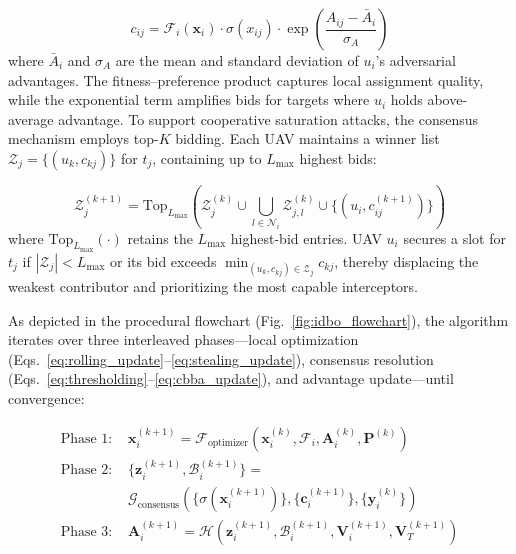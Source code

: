 \documentclass[lettersize,journal]{IEEEtran}
\begin{document}
\begin{equation}
\label{eq:bid_formulation}
c_{ij} = \mathcal{F}_i(\mathbf{x}_i) \cdot \sigma(x_{ij}) \cdot \exp\left(\frac{A_{ij} - \bar{A}_i}{\sigma_A}\right)
\end{equation}
where $\bar{A}_i$ and $\sigma_A$ are the mean and standard deviation of $u_i$'s adversarial advantages. The fitness--preference product captures local assignment quality, while the exponential term amplifies bids for targets where $u_i$ holds above-average advantage. To support cooperative saturation attacks, the consensus mechanism employs top-$K$ bidding. Each UAV maintains a winner list $\mathcal{Z}_{j} = \{(u_k, c_{kj})\}$ for $t_j$, containing up to $L_{\max}$ highest bids:

\begin{equation}
\label{eq:cbba_update}
\mathcal{Z}_{j}^{(k+1)} = \text{Top}_{L_{\max}} \left( \mathcal{Z}_{j}^{(k)} \cup \bigcup_{l \in \mathcal{N}_i} \mathcal{Z}_{j,l}^{(k)} \cup \{(u_i, c_{ij}^{(k+1)})\} \right)
\end{equation}
where $\text{Top}_{L_{\max}}(\cdot)$ retains the $L_{\max}$ highest-bid entries. UAV $u_i$ secures a slot for $t_j$ if $|\mathcal{Z}_{j}| < L_{\max}$ or its bid exceeds $\min_{(u_k, c_{kj}) \in \mathcal{Z}_{j}} c_{kj}$, thereby displacing the weakest contributor and prioritizing the most capable interceptors.

As depicted in the procedural flowchart (Fig.~\ref{fig:idbo_flowchart}), the algorithm iterates over three interleaved phases—local optimization (Eqs.~\ref{eq:rolling_update}--\ref{eq:stealing_update}), consensus resolution (Eqs.~\ref{eq:thresholding}--\ref{eq:cbba_update}), and advantage update—until convergence:

\begin{align}
\text{Phase 1: } & \mathbf{x}_i^{(k+1)} = \mathcal{F}_{\text{optimizer}}\left(\mathbf{x}_i^{(k)}, \mathcal{F}_i, \mathbf{A}_i^{(k)}, \mathbf{P}^{(k)}\right) \label{eq:phase1} \\
\text{Phase 2: } & \{\mathbf{z}_i^{(k+1)}, \mathcal{B}_i^{(k+1)}\} = \nonumber \\ 
& \mathcal{G}_{\text{consensus}}\left(\{\sigma(\mathbf{x}_i^{(k+1)})\}, \{\mathbf{c}_i^{(k+1)}\}, \{\mathbf{y}_i^{(k)}\}\right) \label{eq:phase2} \\
\text{Phase 3: } & \mathbf{A}_i^{(k+1)} = \mathcal{H}\left(\mathbf{z}_i^{(k+1)}, \mathcal{B}_i^{(k+1)}, \mathbf{V}_i^{(k+1)}, \mathbf{V}_T^{(k+1)}\right) \label{eq:phase3}
\end{align}
\end{document}
